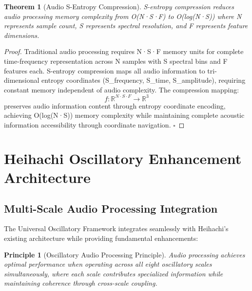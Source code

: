 \documentclass[12pt,a4paper]{article}
\newtheorem{theorem}{Theorem}
\newtheorem{principle}{Principle}
\begin{document}
\begin{theorem}[Audio S-Entropy Compression]
S-entropy compression reduces audio processing memory complexity from O(N·S·F) to O(log(N·S)) where N represents sample count, S represents spectral resolution, and F represents feature dimensions.
\end{theorem}

\begin{proof}
Traditional audio processing requires N·S·F memory units for complete time-frequency representation across N samples with S spectral bins and F features each. S-entropy compression maps all audio information to tri-dimensional entropy coordinates (S_{frequency}, S_{time}, S_{amplitude}), requiring constant memory independent of audio complexity. The compression mapping:
\begin{equation}
f: \mathbb{R}^{N \cdot S \cdot F} \rightarrow \mathbb{R}^3
\end{equation}
preserves audio information content through entropy coordinate encoding, achieving O(log(N·S)) memory complexity while maintaining complete acoustic information accessibility through coordinate navigation. $\square$
\end{proof}

\section{Heihachi Oscillatory Enhancement Architecture}

\subsection{Multi-Scale Audio Processing Integration}

The Universal Oscillatory Framework integrates seamlessly with Heihachi's existing architecture while providing fundamental enhancements:

\begin{principle}[Oscillatory Audio Processing Principle]
Audio processing achieves optimal performance when operating across all eight oscillatory scales simultaneously, where each scale contributes specialized information while maintaining coherence through cross-scale coupling.
\end{principle}
\end{document}
